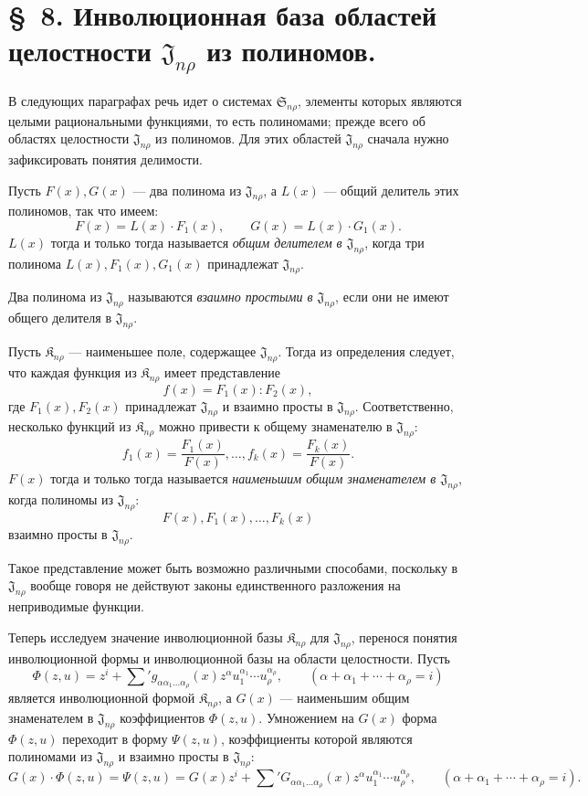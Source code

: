 \documentclass[11pt]{article}
\providecommand{\Kfield}{\mathfrak{K}}
\providecommand{\Ssys}{\mathfrak{S}}
\providecommand{\Jdom}{\mathfrak{J}}
\begin{document}
\section*{\S\ 8. Инволюционная база областей целостности $\Jdom_{n\rho}$ из полиномов.}

В следующих параграфах речь идет о системах $\Ssys_{n\rho}$, элементы которых являются целыми рациональными функциями, то есть полиномами; прежде всего об областях целостности $\Jdom_{n\rho}$ из полиномов. Для этих областей $\Jdom_{n\rho}$ сначала нужно зафиксировать понятия делимости.

Пусть $F(x),G(x)$ --- два полинома из $\Jdom_{n\rho}$, а $L(x)$ --- общий делитель этих полиномов, так что имеем:
\[
  F(x)=L(x)\cdot F_1(x),\qquad G(x)=L(x)\cdot G_1(x).
\]
$L(x)$ тогда и только тогда называется \emph{общим делителем в $\Jdom_{n\rho}$}, когда три полинома $L(x),F_1(x),G_1(x)$ принадлежат $\Jdom_{n\rho}$.

Два полинома из $\Jdom_{n\rho}$ называются \emph{взаимно простыми в $\Jdom_{n\rho}$}, если они не имеют общего делителя в $\Jdom_{n\rho}$.

Пусть $\Kfield_{n\rho}$ --- наименьшее поле, содержащее $\Jdom_{n\rho}$. Тогда из определения следует, что каждая функция из $\Kfield_{n\rho}$ имеет представление
\[
  f(x)=F_1(x):F_2(x),
\]
где $F_1(x),F_2(x)$ принадлежат $\Jdom_{n\rho}$ и взаимно просты в $\Jdom_{n\rho}$. Соответственно, несколько функций из $\Kfield_{n\rho}$ можно привести к общему знаменателю в $\Jdom_{n\rho}$:
\[
  f_1(x)=\frac{F_1(x)}{F(x)},\ldots,
  f_k(x)=\frac{F_k(x)}{F(x)}.
\]
$F(x)$ тогда и только тогда называется \emph{наименьшим общим знаменателем в $\Jdom_{n\rho}$}, когда полиномы из $\Jdom_{n\rho}$:
\[
  F(x),F_1(x),\ldots,F_k(x)
\]
взаимно просты в $\Jdom_{n\rho}$.

Такое представление может быть возможно различными способами, поскольку в $\Jdom_{n\rho}$ вообще говоря не действуют законы единственного разложения на неприводимые функции.

Теперь исследуем значение инволюционной базы $\Kfield_{n\rho}$ для $\Jdom_{n\rho}$, перенося понятия инволюционной формы и инволюционной базы на области целостности. Пусть
\[
  \Phi(z,u)=z^i+\sum{}' g_{\alpha\alpha_1\ldots\alpha_\rho}(x)
  z^\alpha u_1^{\alpha_1}\cdots u_\rho^{\alpha_\rho},
  \qquad
  (\alpha+\alpha_1+\cdots+\alpha_\rho=i)
\]
является инволюционной формой $\Kfield_{n\rho}$, а $G(x)$ --- наименьшим общим знаменателем в $\Jdom_{n\rho}$ коэффициентов $\Phi(z,u)$. Умножением на $G(x)$ форма $\Phi(z,u)$ переходит в форму $\Psi(z,u)$, коэффициенты которой являются полиномами из $\Jdom_{n\rho}$ и взаимно просты в $\Jdom_{n\rho}$:
\[
  G(x)\cdot\Phi(z,u)=\Psi(z,u)
  =G(x)z^i+
  \sum{}' G_{\alpha\alpha_1\ldots\alpha_\rho}(x)
  z^\alpha u_1^{\alpha_1}\cdots u_\rho^{\alpha_\rho},
  \qquad
  (\alpha+\alpha_1+\cdots+\alpha_\rho=i).
\]
\end{document}
